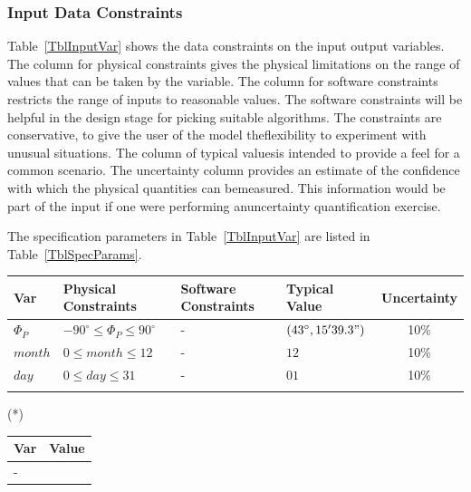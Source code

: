 \documentclass[12pt]{article}
\begin{document}
\subsubsection{Input Data Constraints} \label{sec_DataConstraints}    

Table~\ref{TblInputVar} shows the data constraints on the input output
variables.  The column for physical constraints gives the physical limitations
on the range of values that can be taken by the variable.  The column for
software constraints restricts the range of inputs to reasonable values.  The
software constraints will be helpful in the design stage for picking suitable
algorithms. The constraints are conservative, to give the user of the model
theflexibility to experiment with unusual situations. The column of typical
valuesis intended to provide a feel for a common scenario. The uncertainty
column
provides an estimate of the confidence with which the physical quantities can
bemeasured. This information would be part of the input if one were performing
anuncertainty quantification exercise.

The specification parameters in Table~\ref{TblInputVar} are listed in
Table~\ref{TblSpecParams}.

\begin{table}[!h]
  \caption{Input Variables} \label{TblInputVar}
  \renewcommand{\arraystretch}{1.2}
\noindent \begin{longtable*}{l l l l c} 
  \toprule
\textbf{Var} & \textbf{Physical Constraints} & \textbf{Software Constraints} &
\textbf{Typical Value} & \textbf{Uncertainty}\\
  \midrule 
$\Phi_P$ & $- 90^\circ \leq \Phi_P \leq 90^\circ $ & $\text{-}$ & {$(43^\circ,
15'39.3")$} & 10\%\\
  $month$ & $0 \leq month \leq 12$ & $\text{-}$ & $12$& 10\%\\
  $day$ & $0 \leq day \leq 31$ & $\text{-}$ & $01$ & 10\%\\
  \\
  \bottomrule
\end{longtable*}
\end{table}

\noindent 
\begin{description}

\item[(*)] 

\end{description}

\begin{table}[!h]
\caption{Specification Parameter Values} \label{TblSpecParams}
\renewcommand{\arraystretch}{1.2}
\noindent \begin{longtable*}{l l} 
  \toprule
  \textbf{Var} & \textbf{Value} \\
  \midrule 
  $\text{-}$ & \text{-}\\
  \bottomrule
\end{longtable*}
\end{table}
\end{document}
